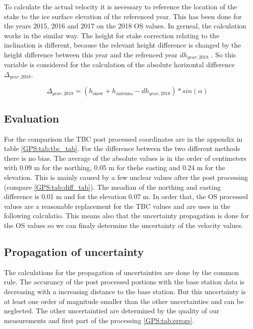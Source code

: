To calculate the actual velocity it is necessary to reference the location of the stake to the ice surface elevation of the referenced year. 
This has been done for the years 2015, 2016 and 2017 on the 2018 OS values.
In gerneal, the calculation works in the similar way.
The height for stake correction relating to the inclination is different, because the relevant height difference is changed by the height difference between this year and the refrenced year $dh_{year,2018}$ . So this variable is considered for the calculation of the absolute horizontal difference $\Delta_{year,2018}$.

\begin{equation}
	\Delta_{year,2018} = (h_{\text{snow}} + h_{\text{antenna}} - dh_{year,2018}) * sin(\alpha)
\end{equation}

\subsection{Evaluation}
For the comparison the TBC post processed coordinates are in the appendix in table \ref{GPS:tab:tbc_tab}.
For the difference between the two different methods there is no bias.
The average of the absolute values is in the order of centimeters with 0.09 m for the northing, 0.05 m for thehe  easting and 0.24 m for the elevation. 
This is mainly caused by a few unclear values after the post processing (compare \ref{GPS:tab:diff_tab}). The meadian of the northing and easting difference is 0.01 m and for the elevation 0.07 m.  
In order that, the OS processed values are a reasonable replacement for the TBC values and are uses in the following calculatio.
This means also that the uncertainty propagation is done for the OS values so we can finaly determine the uncertainty of the velocity values.

\subsection{Propagation of uncertainty}

The calculations for the propagation of uncertainties are done by the common rule.
The accurancy of the post processed postions with the base station data is decreasing with a increasing distance to the base station. 
But this uncertainty is at least one order of magnitude smaller than the other uncertainties and can be neglected. 
The other uncertaintied are determined by the quality of our measurements and first part of the processing \ref{GPS:tab:errors}.

